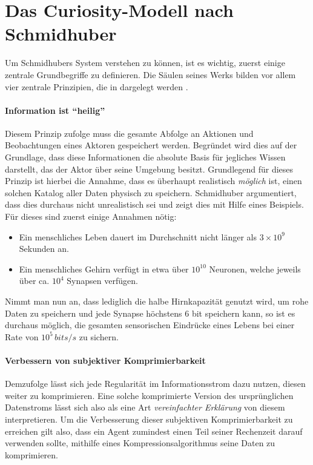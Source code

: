 
\section{Das Curiosity-Modell nach Schmidhuber}
\label{sec:Curiosity_Schmidhuber}
Um Schmidhubers System verstehen zu können, ist es wichtig, zuerst einige zentrale Grundbegriffe zu definieren.
Die Säulen seines Werks bilden vor allem vier zentrale Prinzipien, die in  dargelegt werden \cite{curiosity_schmidhuber}.


\paragraph{Information ist ``heilig''}
\label{sec:Information_Heilig}
Diesem Prinzip zufolge muss die gesamte Abfolge an Aktionen und Beobachtungen eines Aktoren gespeichert werden. Begründet wird dies auf der Grundlage, dass diese Informationen die absolute Basis für jegliches Wissen darstellt, das der Aktor über seine Umgebung besitzt. 
Grundlegend für dieses Prinzip ist hierbei die Annahme, dass es überhaupt realistisch \emph{möglich} ist, einen solchen Katalog aller Daten physisch zu speichern.
Schmidhuber argumentiert, dass dies durchaus nicht unrealistisch sei und zeigt dies mit Hilfe eines Beispiels. 
Für dieses sind zuerst einige Annahmen nötig: 
\begin{itemize}
    \item Ein menschliches Leben dauert im Durchschnitt nicht länger als \(3\times10^9\) Sekunden an.
    \item Ein menschliches Gehirn verfügt in etwa über \(10^{10}\) Neuronen, welche jeweils über ca. \(10^{4}\) Synapsen verfügen.
\end{itemize}
Nimmt man nun an, dass lediglich die halbe Hirnkapazität genutzt wird, um rohe Daten zu speichern und jede Synapse höchstens 6 bit speichern kann, so ist es durchaus möglich, die gesamten sensorischen Eindrücke eines Lebens bei einer Rate von \(10^5\, \textit{bits}/s\) zu sichern.

\paragraph{Verbessern von subjektiver Komprimierbarkeit}
\label{sec:Komprimierbarkeit_verbessern}
Demzufolge lässt sich jede Regularität im Informationsstrom dazu nutzen, diesen weiter zu komprimieren. Eine solche komprimierte Version des ursprünglichen Datenstroms lässt sich also als eine Art \emph{vereinfachter Erklärung} von diesem interpretieren. Um die Verbesserung dieser subjektiven Komprimierbarkeit zu erreichen gilt also, dass ein Agent zumindest einen Teil seiner Rechenzeit darauf verwenden sollte, mithilfe eines Kompressionsalgorithmus seine Daten zu komprimieren.


